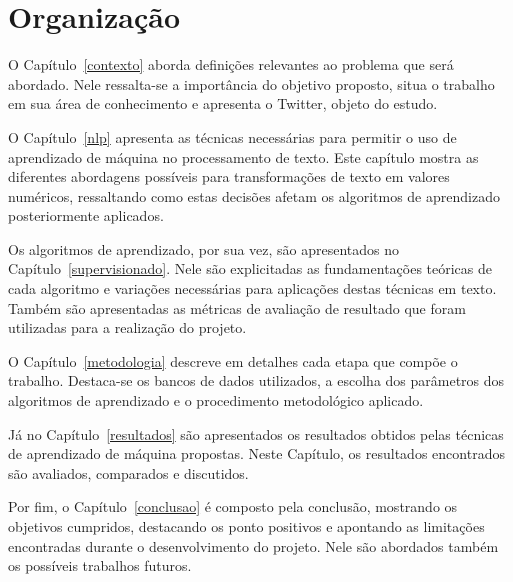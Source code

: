 \section{Organização}

O Capítulo~\ref{contexto} aborda definições relevantes ao problema que será abordado.
Nele ressalta-se a importância do objetivo proposto, situa o trabalho em sua área de conhecimento e apresenta o Twitter,
objeto do estudo.

O Capítulo~\ref{nlp} apresenta as técnicas necessárias para permitir o uso de aprendizado de máquina no processamento de
texto.
Este capítulo mostra as diferentes abordagens possíveis para transformações de texto em valores numéricos, ressaltando
como estas decisões afetam os algoritmos de aprendizado posteriormente aplicados.

Os algoritmos de aprendizado, por sua vez, são apresentados no Capítulo~\ref{supervisionado}.
Nele são explicitadas as fundamentações teóricas de cada algoritmo e variações necessárias para aplicações destas
técnicas em texto.
Também são apresentadas as métricas de avaliação de resultado que foram utilizadas para a realização do projeto.

O Capítulo~\ref{metodologia} descreve em detalhes cada etapa que compõe o trabalho.
Destaca-se os bancos de dados utilizados, a escolha dos parâmetros dos algoritmos de aprendizado e o procedimento
metodológico aplicado.

Já no Capítulo~\ref{resultados} são apresentados os resultados obtidos pelas técnicas de aprendizado de máquina propostas.
Neste Capítulo, os resultados encontrados são avaliados, comparados e discutidos.

Por fim, o Capítulo~\ref{conclusao} é composto pela conclusão, mostrando os objetivos cumpridos, destacando os ponto
positivos e apontando as limitações encontradas durante o desenvolvimento do projeto.
Nele são abordados também os possíveis trabalhos futuros.
